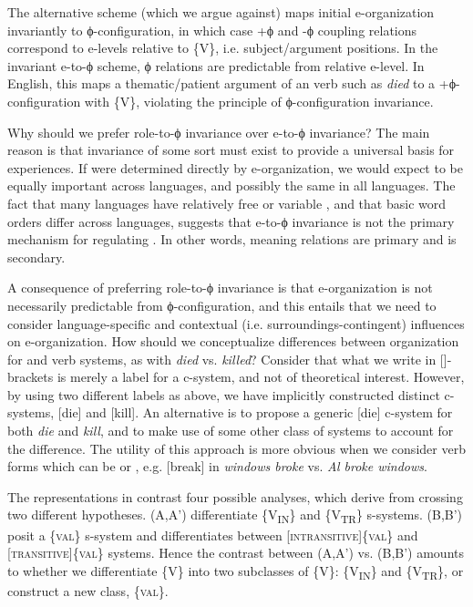   The alternative scheme (which we argue against) maps initial e-organization invariantly to ϕ-configuration, in which case +ϕ and -ϕ coupling relations correspond to e-levels relative to \{V\}, i.e. subject/argument positions. In the invariant e-to-ϕ scheme, ϕ relations are predictable from relative e-level. In English, this maps a thematic/patient argument of an  verb such as \textit{died} to a +ϕ-configuration with \{V\}, violating the principle of ϕ-configuration invariance.

  Why should we prefer role-to-ϕ invariance over e-to-ϕ invariance? The main reason is that invariance of some sort must exist to provide a universal basis for  experiences. If  were determined directly by e-organization, we would expect  to be equally important across languages, and possibly the same in all languages. The fact that many languages have relatively free or variable , and that basic word orders differ across languages, suggests that e-to-ϕ invariance is not the primary mechanism for regulating . In other words, meaning relations are primary and  is secondary.

  A consequence of preferring role-to-ϕ invariance is that e-organization is not necessarily predictable from ϕ-configuration, and this entails that we need to consider language-specific and contextual (i.e. surroundings-contingent) influences on e-organization. How should we conceptualize differences between organization for  and  verb systems, as with \textit{died} vs. \textit{killed}? Consider that what we write in []-brackets is merely a label for a c-system, and not of theoretical interest. However, by using two different labels as above, we have implicitly constructed distinct c-systems, [die] and [kill]. An alternative is to propose a generic [die] c-system for both \textit{die} and \textit{kill}, and to make use of some other class of systems to account for the  difference. The utility of this approach is more obvious when we consider verb forms which can be  or , e.g. [break] in \textit{windows broke} vs. \textit{Al broke windows}. 

  The representations in {} contrast four possible analyses, which derive from crossing two different hypotheses. (A,A') differentiate  \{V\textsubscript{IN}\} and  \{V\textsubscript{TR}\} s-systems. (B,B') posit a  \{\textsc{val}\} s-system and differentiates between [\textsc{intransitive}]\{\textsc{val}\} and [\textsc{transitive}]\{\textsc{val}\} systems. Hence the contrast between (A,A') vs. (B,B') amounts to whether we differentiate \{V\} into two subclasses of \{V\}: \{V\textsubscript{IN}\} and \{V\textsubscript{TR}\}, or construct a new class, \{\textsc{val}\}.

